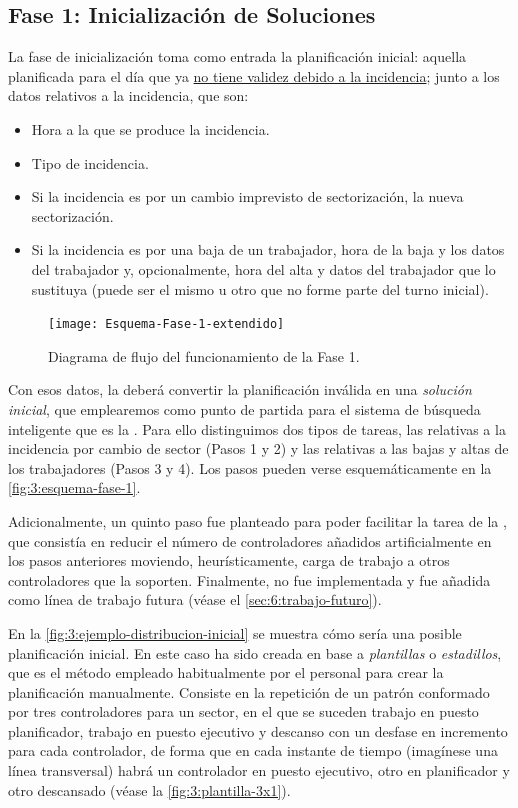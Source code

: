 \subsection{Fase 1: Inicialización de Soluciones} \label{sec:3:inicializacion-soluciones}

La fase de inicialización toma como entrada la planificación inicial: aquella planificada para el día que ya \underline{no tiene validez debido a la incidencia}; junto a los datos relativos a la incidencia, que son:

\begin{itemize}
	\item Hora a la que se produce la incidencia.
	\item Tipo de incidencia.
	\item Si la incidencia es por un cambio imprevisto de sectorización, la nueva sectorización.
	\item Si la incidencia es por una baja de un trabajador, hora de la baja y los datos del trabajador y, opcionalmente, hora del alta y datos del trabajador que lo sustituya (puede ser el mismo u otro que no forme parte del turno inicial).
\end{itemize}

\begin{figure}[htbp]
	\centering
	\texttt{[image: Esquema-Fase-1-extendido]}
	\caption{Diagrama de flujo del funcionamiento de la Fase 1.}
	\label{fig:3:esquema-fase-1}
\end{figure}

Con esos datos, la \faseuno{} deberá convertir la planificación inválida en una \textit{solución inicial}, que 
emplearemos como punto de partida para el sistema de búsqueda inteligente que es la \fasedos{}.
Para ello distinguimos dos tipos de tareas, las relativas a la incidencia por cambio de sector (Pasos 1 y 2) y las relativas a las bajas y altas de los trabajadores (Pasos 3 y 4).
Los pasos pueden verse esquemáticamente en la \autoref{fig:3:esquema-fase-1}.

Adicionalmente, un quinto paso fue planteado para poder facilitar la tarea de la \fasedos{}, que consistía en reducir el número de controladores añadidos artificialmente en los pasos anteriores moviendo, heurísticamente, carga de trabajo a otros controladores que la soporten.
Finalmente, no fue implementada y fue añadida como línea de trabajo futura (véase el \autoref{sec:6:trabajo-futuro}).

En la \autoref{fig:3:ejemplo-distribucion-inicial} se muestra cómo sería una posible planificación inicial.
En este caso ha sido creada en base a \textit{plantillas} o \textit{estadillos}, que es el método empleado habitualmente por el personal para crear la planificación manualmente.
Consiste en la repetición de un patrón conformado por tres controladores para un sector, en el que se suceden trabajo en puesto planificador, trabajo en puesto ejecutivo y descanso con un desfase en incremento para cada controlador, de forma que en cada instante de tiempo (imagínese una línea transversal) habrá un controlador en puesto ejecutivo, otro en planificador y otro descansado (véase  la \autoref{fig:3:plantilla-3x1}).

